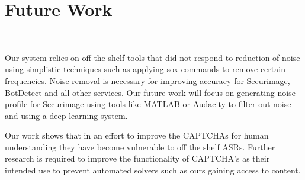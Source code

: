 \section{Future Work}\mbox {} \
\label{sec:future}

Our system relies on off the shelf tools that did not respond to reduction of noise using simplistic techniques such as applying sox commands to remove certain frequencies. Noise removal is necessary for improving accuracy for Securimage, BotDetect and all other services. Our future work will focus on generating noise profile for Securimage using tools like MATLAB or Audacity to filter out noise and using a deep learning system.\newline

Our work shows that in an effort to improve the CAPTCHAs for human understanding they have become vulnerable to off the shelf ASRs. Further research is required to improve the functionality of CAPTCHA's as their intended use to prevent automated solvers such as ours gaining access to content. 